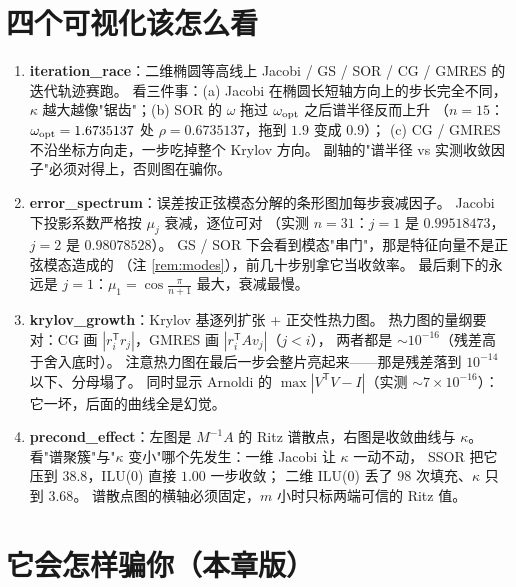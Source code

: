 \section{四个可视化该怎么看}

\begin{enumerate}
  \item \textbf{iteration\_race}：二维椭圆等高线上 Jacobi / GS / SOR / CG / GMRES 的迭代轨迹赛跑。
        看三件事：(a) Jacobi 在椭圆长短轴方向上的步长完全不同，
        $\kappa$ 越大越像"锯齿"；(b) SOR 的 $\omega$ 拖过 $\omega_{\rm opt}$ 之后谱半径反而上升
        （$n=15$：$\omega_{\rm opt}=1.6735137$ 处 $\rho=0.6735137$，拖到 $1.9$ 变成 $0.9$）；
        (c) CG / GMRES 不沿坐标方向走，一步吃掉整个 Krylov 方向。
        副轴的"谱半径 vs 实测收敛因子"必须对得上，否则图在骗你。
  \item \textbf{error\_spectrum}：误差按正弦模态分解的条形图加每步衰减因子。
        Jacobi 下投影系数严格按 $\mu_j$ 衰减，逐位可对
        （实测 $n=31$：$j=1$ 是 $0.99518473$，$j=2$ 是 $0.98078528$）。
        GS / SOR 下会看到模态"串门"，那是特征向量不是正弦模态造成的
        （注 \ref{rem:modes}），前几十步别拿它当收敛率。
        最后剩下的永远是 $j=1$：$\mu_1=\cos\frac{\pi}{n+1}$ 最大，衰减最慢。
  \item \textbf{krylov\_growth}：Krylov 基逐列扩张 + 正交性热力图。
        热力图的量纲要对：CG 画 $|r_i^{\mathsf T}r_j|$，GMRES 画 $|r_i^{\mathsf T}Av_j|$（$j<i$），
        两者都是 $\sim10^{-16}$（残差高于舍入底时）。
        注意热力图在最后一步会整片亮起来——那是残差落到 $10^{-14}$ 以下、分母塌了。
        同时显示 Arnoldi 的 $\max|V^{\mathsf T}V-I|$（实测 $\sim7\times10^{-16}$）：
        它一坏，后面的曲线全是幻觉。
  \item \textbf{precond\_effect}：左图是 $M^{-1}A$ 的 Ritz 谱散点，右图是收敛曲线与 $\kappa$。
        看"谱聚簇"与"$\kappa$ 变小"哪个先发生：一维 Jacobi 让 $\kappa$ 一动不动，
        SSOR 把它压到 $38.8$，ILU(0) 直接 $1.00$ 一步收敛；
        二维 ILU(0) 丢了 $98$ 次填充、$\kappa$ 只到 $3.68$。
        谱散点图的横轴必须固定，$m$ 小时只标两端可信的 Ritz 值。
\end{enumerate}



\section{它会怎样骗你（本章版）}

